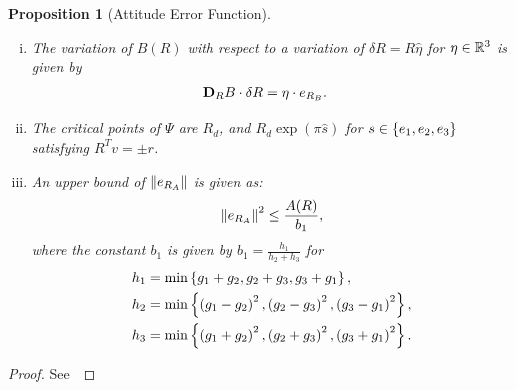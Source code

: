\documentclass[fleqn]{IJCAS}  %
\newtheorem{prop}{Proposition}
\begin{document}
\begin{multicols}{2}
\begin{prop}[Attitude Error Function]
\begin{enumerate}[(i)]
	\begin{align}
		\dirDiff{A}{R} &= \eta \cdot e_{R_A} .
	\end{align}
	\item \label{item:prop_erb} The variation of \( B(R) \) with respect to a variation of \( \delta R = R \hat{\eta} \) for \( \eta \in \mathbb{R}^3 \) is given by
	\begin{align}
		\mathbf{D}_{R} B \cdot \delta R &= \eta \cdot e_{R_{B}} .
	\end{align}
	\item \label{item:prop_crit}The critical points of \( \Psi \) are $R_d$, and $R_d \exp(\pi \hat{s})$ for $s \in \left\{ e_1, e_2, e_3 \right\}$ satisfying $R^T v = \pm r$.
	\item \label{item:prop_era_upbound}An upper bound of \( \left\| e_{R_A} \right\| \) is given as:
	\begin{align}
		\left\| e_{R_A} \right\|^2 \leq \frac{A(R)}{b_1} , \label{eqn:psi_lower_bound}
	\end{align}
	where the constant \( b_1 \) is given by \( b_1 = \frac{h_1}{h_2 + h_3} \) for 
	\begin{align*}
		h_1 &= \min\left\{ g_1 + g_2, g_2 + g_3 , g_3 + g_1 \right\} ,\\
		h_2 &= \min\left\{ \left( g_1 -g_2 \right)^2,\left( g_2 -g_3 \right)^2 , \left( g_3 -g_1 \right)^2 \right\} ,\\
		h_3 &= \min\left\{ \left( g_1 + g_2 \right)^2, \left( g_2 + g_3 \right)^2 , \left( g_3 + g_1 \right)^2 \right\}.		
	\end{align*}
\end{enumerate}
\end{prop}
\begin{proof}
See~
\end{proof}


\end{multicols}
\end{document}
